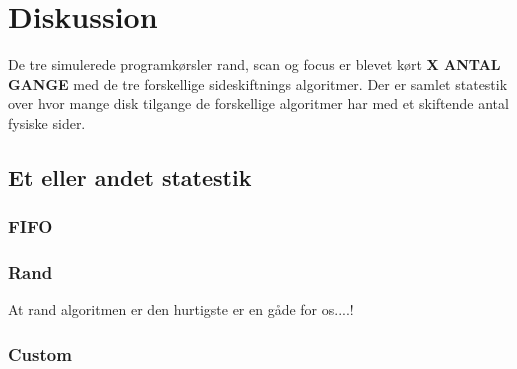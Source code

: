 \section{Diskussion}
De tre simulerede programkørsler rand, scan og focus er blevet kørt \textbf{X ANTAL GANGE} med de tre forskellige sideskiftnings algoritmer. Der er samlet statestik over hvor mange disk tilgange de forskellige algoritmer har med et skiftende antal fysiske sider.

\subsection{Et eller andet statestik}

\subsubsection{FIFO}

\subsubsection{Rand}
At rand algoritmen er den hurtigste er en gåde for os....!
\subsubsection{Custom}